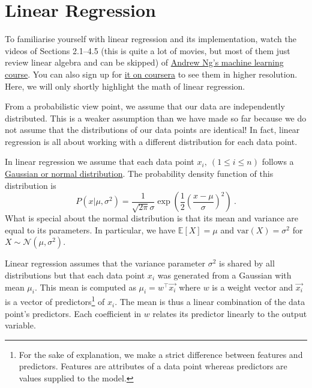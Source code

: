 \documentclass[11pt, leqno, a4paper]{article}
\begin{document}
\section{Linear Regression}
To familiarise yourself with linear regression and its implementation, watch the
videos of Sections 2.1--4.5 (this is quite a lot of movies, but most of them just review linear algebra and can be skipped) of \href{https://www.youtube.com/watch?v=kHwlB_j7Hkc&list=PLLssT5z_DsK-h9vYZkQkYNWcItqhlRJLN&index=5&t=2s}{Andrew Ng's machine
learning course}. You can also sign up for \href{https://www.coursera.org/learn/machine-learning/home}{it on coursera} to see them
in higher resolution. Here, we will only shortly highlight the math of linear regression.

From a probabilistic view point, we assume that our data are independently distributed. This is a weaker
assumption than we have made so far because we do not assume that the distributions of our data points
are identical! In fact, linear regression is all about working with a different distribution for each
data point. 

In linear regression we assume that each data point $ x_{i},\ (1 \leq i \leq n) $ follows a 
\href{https://en.wikipedia.org/wiki/Normal_distribution}{Gaussian or normal distribution}. The probability
density function of this distribution is
\begin{equation}
P(x|\mu, \sigma^{2}) = \frac{1}{\sqrt{2\pi}\sigma}\exp\left(\frac{1}{2}\left(\frac{x - \mu}{\sigma}\right)^{2}\right) \ .
\end{equation}
What is special about the normal distribution is that its mean and variance are equal to its parameters.
In particular, we have $ \mathbb{E}[X] = \mu $ and $ \text{var}(X) = \sigma^{2} $ for 
$ X \sim \mathcal{N}(\mu, \sigma^{2}) $.

Linear regression assumes that the variance parameter $ \sigma^{2} $ is shared by all distributions
but that each data point $ x_{i} $ was generated from a Gaussian with mean $ \mu_{i} $. This mean
is computed as $ \mu_{i} = w^{\top}\vec{x_{i}} $ where $ w $ is a weight vector and $ \vec{x_{i}} $ is
a vector of predictors\footnote{For the sake of explanation, we make a strict difference between
features and predictors. Features are attributes of a data point whereas predictors are values
supplied to the model.} of $ x_{i} $. The mean is thus a linear combination of the data point's predictors.
Each coefficient in $ w $ relates its predictor linearly to the output variable.
\end{document}
